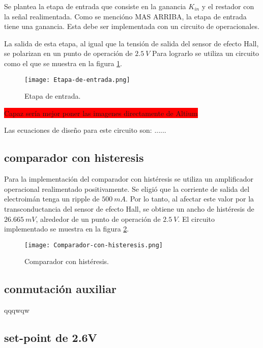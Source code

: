 Se plantea la etapa de entrada que consiste en la ganancia $K_{in}$ y el restador con la señal realimentada. Como se mencióno MAS ARRIBA, la etapa de entrada tiene una ganancia. Esta debe ser implementada con un circuito de operacionales.

La salida de esta etapa, al igual que la tensión de salida del sensor de efecto Hall, se polarizan en un punto de operación de $2.5\:V$ Para lograrlo se utiliza un circuito como el que se muestra en la figura \ref{fig:img_etapa-de-entrada}.


\begin{figure}[H]
	\centering
	\texttt{[image: Etapa-de-entrada.png]}
	\caption{Etapa de entrada.}
	\label{fig:img_etapa-de-entrada}
\end{figure}
\colorbox{red}{Capaz sería mejor poner las imagenes directamente de Altium}

Las ecuaciones de diseño para este circuito son: ......


\subsection{comparador con histeresis}

Para la implementación del comparador con histéresis se utiliza un amplificador operacional realimentado positivamente. Se eligió que la corriente de salida del electroimán tenga un ripple de $500\:mA$. Por lo tanto, al afectar este valor por la transconductancia del sensor de efecto Hall, se obtiene un ancho de histéresis de $26.665\:mV$, alrededor de un punto de operación de $2.5\:V$. El circuito implementado se muestra en la figura \ref{fig:img_comp-con-hist}.

\begin{figure}[H]
	\centering
	\texttt{[image: Comparador-con-histeresis.png]}
	\caption{Comparador con histéresis.}
	\label{fig:img_comp-con-hist}
\end{figure}

\subsection{conmutación auxiliar}
qqqwqw
\subsection{set-point de 2.6V}
 